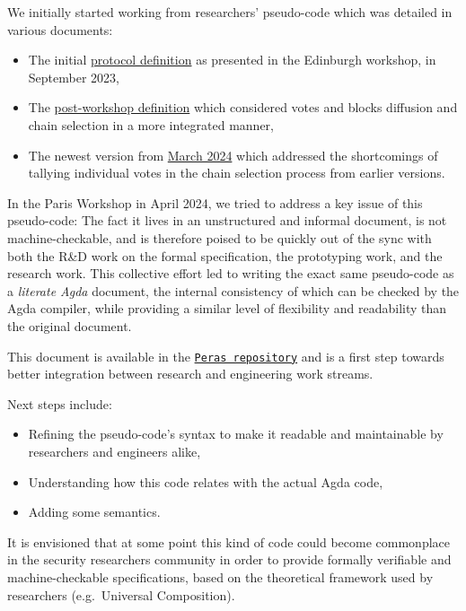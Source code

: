 \documentclass[10pt]{article}
\providecommand{\tightlist}{%
  \setlength{\itemsep}{0pt}\setlength{\parskip}{0pt}}
\begin{document}
We initially started working from researchers' pseudo-code which was
detailed in various documents:

\begin{itemize}
\tightlist
\item
  The initial
  \href{https://docs.google.com/document/d/1QMn1CqS4zSbKzvozhcAtc7MN_nMfVHhP25pMTxyhhZ8/edit\#heading=h.8bsvt41k7bj1}{protocol
  definition} as presented in the Edinburgh workshop, in September 2023,
\item
  The
  \href{https://docs.google.com/document/d/1lywi65s1nQpAGgMpzPXD-sLzYNES-FZ8SHXF75VCKuI/edit\#heading=h.dqvlvyqlb2s4}{post-workshop
  definition} which considered votes and blocks diffusion and chain
  selection in a more integrated manner,
\item
  The newest version from
  \href{https://docs.google.com/document/d/1w_jHsojcBxZHgGrr63ZGa4nhkgEpkL6a2cFYiq8Vf8c/edit}{March
  2024} which addressed the shortcomings of tallying individual votes in
  the chain selection process from earlier versions.
\end{itemize}

In the Paris Workshop in April 2024, we tried to address a key issue of
this pseudo-code: The fact it lives in an unstructured and informal
document, is not machine-checkable, and is therefore poised to be
quickly out of the sync with both the R\&D work on the formal
specification, the prototyping work, and the research work. This
collective effort led to writing the exact same pseudo-code as a
\emph{literate Agda} document, the internal consistency of which can be
checked by the Agda compiler, while providing a similar level of
flexibility and readability than the original document.

This document is available in the
\href{../../src/Peras/ProtocolL.lagda.md}{\color{blue}\texttt{Peras repository}} and is a
first step towards better integration between research and engineering
work streams.

Next steps include:

\begin{itemize}
\tightlist
\item
  Refining the pseudo-code's syntax to make it readable and maintainable
  by researchers and engineers alike,
\item
  Understanding how this code relates with the actual Agda code,
\item
  Adding some semantics.
\end{itemize}

It is envisioned that at some point this kind of code could become
commonplace in the security researchers community in order to provide
formally verifiable and machine-checkable specifications, based on the
theoretical framework used by researchers (e.g.~Universal Composition).
\end{document}
